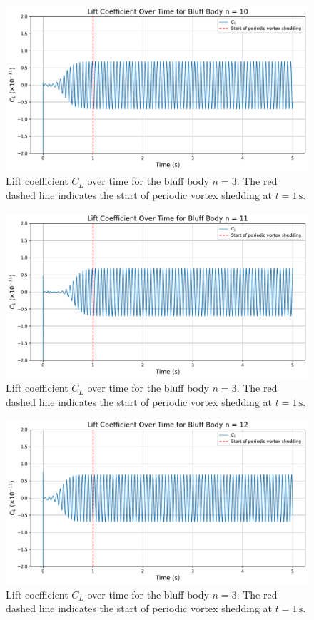 \begin{figure}[H]
	\centering
	\includegraphics[width=\textwidth]{images/10face_graph}
	\caption{Lift coefficient $C_L$ over time for the bluff body $n=3$. The red dashed line indicates the start of periodic vortex shedding at $t = 1\,\mathrm{s}$.}
	\label{fig:10FaceGraph} 
\end{figure}

\begin{figure}[H]
	\centering
	\includegraphics[width=\textwidth]{images/11face_graph}
	\caption{Lift coefficient $C_L$ over time for the bluff body $n=3$. The red dashed line indicates the start of periodic vortex shedding at $t = 1\,\mathrm{s}$.}
	\label{fig:11FaceGraph} 
\end{figure}

\begin{figure}[H]
	\centering
	\includegraphics[width=\textwidth]{images/12face_graph}
	\caption{Lift coefficient $C_L$ over time for the bluff body $n=3$. The red dashed line indicates the start of periodic vortex shedding at $t = 1\,\mathrm{s}$.}
	\label{fig:12FaceGraph} 
\end{figure}

